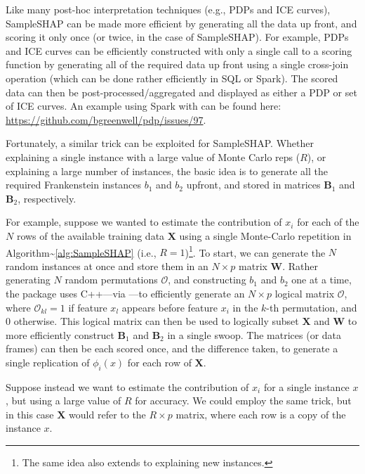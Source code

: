 Like many post-hoc interpretation techniques (e.g., PDPs and ICE
curves), SampleSHAP can be made more efficient by generating all the
data up front, and scoring it only once (or twice, in the case of
SampleSHAP). For example, PDPs and ICE curves can be efficiently
constructed with only a single call to a scoring function by generating
all of the required data up front using a single cross-join operation
(which can be done rather efficiently in SQL or Spark). The scored data
can then be post-processed/aggregated and displayed as either a PDP or
set of ICE curves. An example using Spark with 
\citet{R-sparklyr} can be found here:
\url{https://github.com/bgreenwell/pdp/issues/97}.

Fortunately, a similar trick can be exploited for SampleSHAP. Whether
explaining a single instance with a large value of Monte Carlo reps
(\(R\)), or explaining a large number of instances, the basic idea is to
generate all the required Frankenstein instances \(b_1\) and \(b_2\)
upfront, and stored in matrices \(\boldsymbol{B}_1\) and
\(\boldsymbol{B}_2\), respectively.

For example, suppose we wanted to estimate the contribution of \(x_i\)
for each of the \(N\) rows of the available training data
\(\boldsymbol{X}\) using a single Monte-Carlo repetition in
Algorithm\textasciitilde{}\ref{alg:SampleSHAP} (i.e.,
\(R = 1\))\footnote{The same idea also extends to explaining new instances.}.
To start, we can generate the \(N\) random instances at once and store
them in an \(N \times p\) matrix \(\boldsymbol{W}\). Rather generating
\(N\) random permutations \(\mathcal{O}\), and constructing \(b_1\) and
\(b_2\) one at a time, the  package uses C++---via
 \citep{R-Rcpp}---to efficiently generate an
\(N \times p\) logical matrix \(\boldsymbol{\mathcal{O}}\), where
\(\boldsymbol{\mathcal{O}}_{kl} = 1\) if feature \(x_l\) appears before
feature \(x_i\) in the \(k\)-th permutation, and \(0\) otherwise. This
logical matrix can then be used to logically subset \(\boldsymbol{X}\)
and \(\boldsymbol{W}\) to more efficiently construct
\(\boldsymbol{B}_1\) and \(\boldsymbol{B}_2\) in a single swoop. The
matrices (or data frames) can then be each scored once, and the
difference taken, to generate a single replication of
\(\phi_i\left(x\right)\) for each row of \(\boldsymbol{X}\).

Suppose instead we want to estimate the contribution of \(x_i\) for a
single instance \(x\), but using a large value of \(R\) for accuracy. We
could employ the same trick, but in this case \(\boldsymbol{X}\) would
refer to the \(R \times p\) matrix, where each row is a copy of the
instance \(x\).

